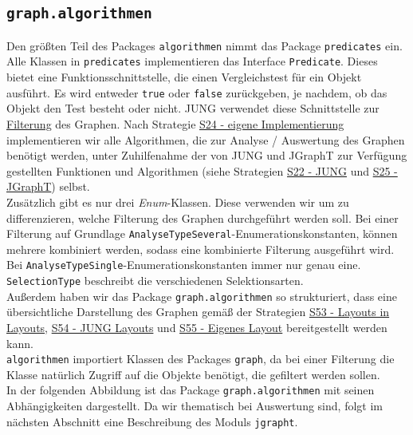 \documentclass[enabledeprecatedfontcommands,fontsize=11pt,paper=a4,twoside]{scrartcl}
\newcounter{one}
\begin{document}
	\subsection{\texttt{graph.algorithmen}}
	Den größten Teil des Packages \texttt{algorithmen} nimmt das Package \texttt{predicates} ein. Alle Klassen in \texttt{predicates} implementieren das Interface \texttt{Predicate}. Dieses bietet eine Funktionsschnittstelle, die einen Vergleichstest für ein Objekt ausführt. Es wird entweder \texttt{true} oder \texttt{false} zurückgeben, je nachdem, ob das Objekt den Test besteht oder nicht. JUNG verwendet diese Schnittstelle zur \hyperlink{ss}{Filterung} des Graphen. Nach Strategie \hyperlink{eigeneImplementierung}{S24 - eigene Implementierung} implementieren wir alle Algorithmen, die zur Analyse / Auswertung des Graphen benötigt werden, unter Zuhilfenahme der von JUNG und JGraphT zur Verfügung gestellten Funktionen und Algorithmen (siehe Strategien \hyperlink{fff}{S22  - JUNG} und \hyperlink{xxx}{S25 - JGraphT}) selbst.\\
	
	Zusätzlich gibt es nur drei \textit{Enum}-Klassen. Diese verwenden wir um zu differenzieren, welche Filterung des Graphen durchgeführt werden soll. Bei einer Filterung auf Grundlage \texttt{AnalyseTypeSeveral}-Enumerationskonstanten, können mehrere kombiniert werden, sodass eine kombinierte Filterung ausgeführt wird. Bei \texttt{AnalyseTypeSingle}-Enumerationskonstanten immer nur genau eine. \texttt{SelectionType} beschreibt die verschiedenen Selektionsarten. \\
	
	Außerdem haben wir das Package \texttt{graph.algorithmen} so strukturiert, dass eine übersichtliche Darstellung des Graphen gemäß der Strategien \hyperlink{sss}{S53 - Layouts in Layouts}, \hyperlink{xee}{S54 - JUNG Layouts} und \hyperlink{xff}{S55 - Eigenes Layout} bereitgestellt werden kann. \\
	
	\texttt{algorithmen} importiert Klassen des Packages \texttt{graph}, da bei einer Filterung die Klasse natürlich Zugriff auf die Objekte benötigt, die gefiltert werden sollen.\\
	
	In der folgenden Abbildung ist das Package \texttt{graph.algorithmen} mit seinen Abhängigkeiten dargestellt. Da wir thematisch bei Auswertung sind, folgt im nächsten Abschnitt eine Beschreibung des Moduls \texttt{jgrapht}.
	
	
	
\end{document}

